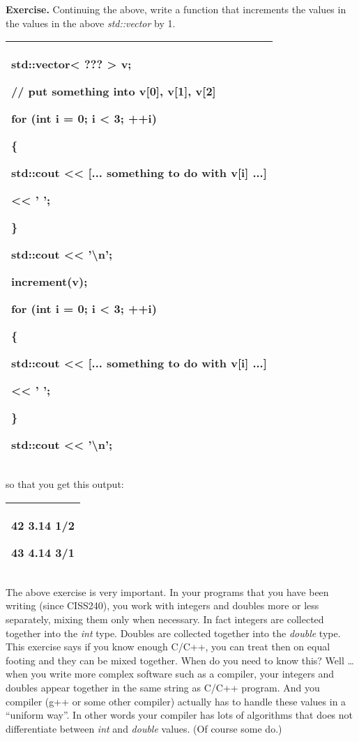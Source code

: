\documentclass[
]{article}
\begin{document}
\textbf{Exercise.} Continuing the above, write a function that
increments the values in the values in the above \emph{std::vector} by
1.

\begin{longtable}[]{@{}l@{}}
\toprule
\endhead
\begin{minipage}[t]{0.97\columnwidth}\raggedright
std::vector\textless{} ??? \textgreater{} v;

// put something into v{[}0{]}, v{[}1{]}, v{[}2{]}

for (int i = 0; i \textless{} 3; ++i)

\{

std::cout \textless\textless{} {[}... something to do with v{[}i{]}
...{]}

\textless\textless{} ' ';

\}

std::cout \textless\textless{} '\textbackslash n';

increment(v);

for (int i = 0; i \textless{} 3; ++i)

\{

std::cout \textless\textless{} {[}... something to do with v{[}i{]}
...{]}

\textless\textless{} ' ';

\}

std::cout \textless\textless{} '\textbackslash n';\strut
\end{minipage}\tabularnewline
\bottomrule
\end{longtable}

so that you get this output:

\begin{longtable}[]{@{}l@{}}
\toprule
\endhead
\begin{minipage}[t]{0.97\columnwidth}\raggedright
42 3.14 1/2

43 4.14 3/1\strut
\end{minipage}\tabularnewline
\bottomrule
\end{longtable}

The above exercise is very important. In your programs that you have
been writing (since CISS240), you work with integers and doubles more or
less separately, mixing them only when necessary. In fact integers are
collected together into the \emph{int} type. Doubles are collected
together into the \emph{double} type. This exercise says if you know
enough C/C++, you can treat then on equal footing and they can be mixed
together. When do you need to know this? Well \ldots{} when you write
more complex software such as a compiler, your integers and doubles
appear together in the same string as C/C++ program. And you compiler
(g++ or some other compiler) actually has to handle these values in a
``uniform way''. In other words your compiler has lots of algorithms
that does not differentiate between \emph{int} and \emph{double} values.
(Of course some do.)
\end{document}
